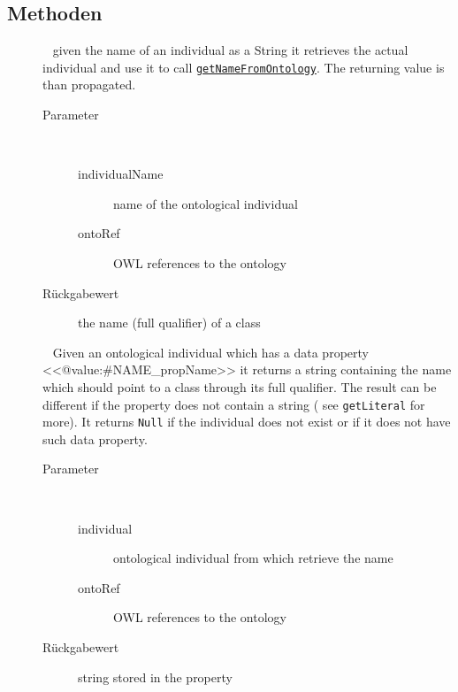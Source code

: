 \subsection{Methoden}
\begin{description}
\item[{\label{ontologyFramework.OFDataMapping.ReservatedDataType.NameMapper.getNameFromOntology(java.lang.String,ontologyFramework.OFContextManagement.OWLReferences)}}]
~ given the name of an individual as a String
 it retrieves the actual individual and use it to call
 \texttt{\hyperlink{ontologyFramework.OFDataMapping.ReservatedDataType.NameMapper.getNameFromOntology(org.semanticweb.owlapi.model.OWLNamedIndividual,ontologyFramework.OFContextManagement.OWLReferences)}{getNameFromOntology}}.
 The returning value is than propagated.
\begin{description}
\item[Parameter] ~
\begin{description}
\item[individualName]
name of the ontological individual
\item[ontoRef]
OWL references to the ontology
\end{description}
\item[Rückgabewert] 
the name (full qualifier) of a class
\end{description}
\item[{\label{ontologyFramework.OFDataMapping.ReservatedDataType.NameMapper.getNameFromOntology(org.semanticweb.owlapi.model.OWLNamedIndividual,ontologyFramework.OFContextManagement.OWLReferences)}}]
~ Given an ontological individual which has a data property <<@value:#NAME_propName>>
 it returns a string containing the name which should
 point to a class through its full qualifier. 
 The result can be different if the property
 does not contain a string ( see \texttt{getLiteral} for more).
 It returns \verb!Null! if the individual does not exist or if
 it does not have such data property.
\begin{description}
\item[Parameter] ~
\begin{description}
\item[individual]
ontological individual from which retrieve the name
\item[ontoRef]
OWL references to the ontology
\end{description}
\item[Rückgabewert] 
string stored in the property
\end{description}
\end{description}
